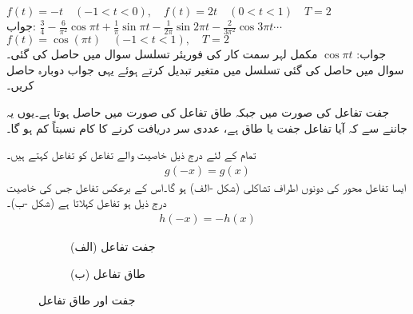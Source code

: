 \quad
$f(t)=-t\quad (-1<t<0),\quad f(t)=2t\quad (0<t<1)\quad T=2$\\
جواب:\quad
$\tfrac{3}{4}-\tfrac{6}{\pi^2}\cos \pi t+\tfrac{1}{\pi}\sin \pi t-\tfrac{1}{2\pi}\sin 2\pi t-\tfrac{2}{3\pi^2}\cos 3\pi t\cdots$
\quad
$f(t)=\cos(\pi t)\quad (-1<t<1),\quad T=2$\\
جواب:\quad
$\cos \pi t$
\quad
مکمل لہر سمت کار کی فوریئر تسلسل سوال  میں حاصل کی گئی۔سوال  میں حاصل کی گئی تسلسل میں متغیر تبدیل کرتے ہوئے یہی جواب دوبارہ حاصل کریں۔

جفت تفاعل کی صورت میں  جبکہ طاق تفاعل کی صورت میں  حاصل ہوتا ہے۔یوں یہ جاننے سے کہ آیا تفاعل جفت یا طاق ہے، عددی سر دریافت کرنے کا کام نسبتاً کم ہو گا۔

تمام  کے لئے درج ذیل خاصیت والے تفاعل  کو  تفاعل کہتے ہیں۔
\begin{align}\label{مساوات_فوریئر_جفت_تعریف}
g(-x)=g(x)
\end{align}
ایسا تفاعل  محور کی دونوں اطراف تشاکلی (شکل -الف) ہو گا۔اس کے برعکس تفاعل  جس کی خاصیت درج ذیل ہو  تفاعل کہلاتا ہے (شکل -ب)۔
\begin{align}\label{مساوات_فوریئر_طاق_تعریف}
h(-x)=-h(x)
\end{align}
%
\begin{figure}
\centering
\begin{subfigure}{0.5\textwidth}
\centering
{}
\caption*{(الف) جفت تفاعل}
\end{subfigure}%
\begin{subfigure}{0.5\textwidth}
\centering
{}
\caption*{(ب) طاق تفاعل}
\end{subfigure}%
\caption{جفت اور طاق تفاعل}
\label{شکل_فوریئر_جفت_طاق}
\end{figure}


